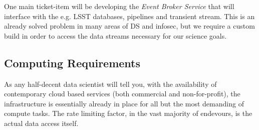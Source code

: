 \documentclass[oneside, a4paper, onecolumn, 11pt]{article}
\begin{document}
\smallskip
\smallskip
\noindent
One main ticket-item will be developing the {\it Event Broker Service}
that will interface with the e.g. LSST databases, pipelines and
transient stream. This is an already solved problem in many areas 
of DS and infosec, but we require a custom build in order to access 
the data streams necessary for our science goals. 


\subsection*{Computing Requirements}
As any half-decent data scientist will tell you, with the availability of 
contemporary cloud based services (both commercial and non-for-profit), 
the infrastructure is essentially already in place for all but the most demanding
of compute tasks. The rate limiting factor, in the vast majority of endevours, is 
the actual data access itself. 
\end{document}
